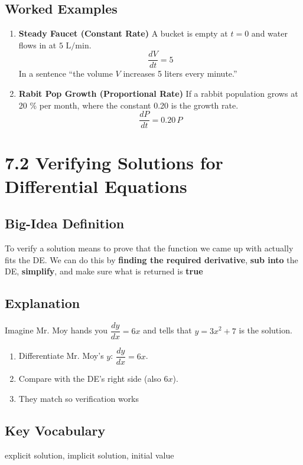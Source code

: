 \documentclass{article}
\begin{document}
\subsection*{Worked Examples}
\begin{enumerate}
  \item \textbf{Steady Faucet (Constant Rate)}  
        A bucket is empty at $t=0$ and water flows in at \(5\text{ L/min}\).  
        \[
          \frac{dV}{dt}=5
        \]  
        In a sentence “the volume \(V\) increases 5 liters every minute.”

  \item \textbf{Rabit Pop Growth (Proportional Rate)}  
        If a rabbit population grows at 20 \% per month, where the constant 0.20 is the {growth rate}.
        \[
          \frac{dP}{dt}=0.20\,P
        \]  
        
\end{enumerate}

\newpage
\section{7.2 Verifying Solutions for Differential Equations}

\subsection*{Big-Idea Definition}
To verify a solution means to prove that the function we came up with actually fits the DE.
We can do this by \textbf{finding the required derivative}, \textbf{sub into} the DE,
\textbf{simplify}, and make sure what is returned is \textbf{true}

\subsection*{Explanation}
Imagine Mr. Moy hands you $\dfrac{dy}{dx}=6x$ and tells that
$y=3x^{2}+7$ is the solution.  


\begin{enumerate}
  \item Differentiate Mr. Moy's $y$: \(\dfrac{dy}{dx}=6x\).
  \item Compare with the DE’s right side (also $6x$).  
  \item They match so verification works
\end{enumerate}

\subsection*{Key Vocabulary}
 explicit solution, implicit solution,
initial value
\end{document}
